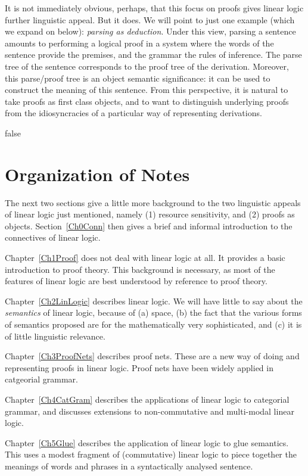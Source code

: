 It is not immediately obvious, perhaps, that this focus on proofs
gives linear logic further linguistic appeal.  But it does.  We will
point to just one example (which we expand on below): {\em parsing as
deduction}.  Under this view, parsing a sentence amounts to performing
a logical proof in a system where the words of the sentence
provide the premises, and the grammar the rules of inference.  The
parse tree of the sentence corresponds to the proof tree of the
derivation.  Moreover, this parse/proof tree is an object semantic
significance: it can be used to construct the meaning of this
sentence.  From this perspective, it is natural to take proofs as
first class objects, and to want to distinguish underlying proofs from
the idiosyncracies of a particular way of representing derivations.

\if false
\section{Organization of Notes}

The next two sections give a little more background to the two
linguistic appeals of linear logic just mentioned, namely 
(1) resource sensitivity,
and (2) proofs as objects.  
Section~\ref{Ch0Conn} then gives a brief
and informal introduction to the connectives of linear logic.

Chapter~\ref{Ch1Proof} does not deal with linear logic at all.  It
provides a basic introduction to proof theory.  This background is
necessary, as most of the features of linear logic are best understood
by reference to proof theory.  

Chapter~\ref{Ch2LinLogic} 
describes linear logic.  We will have little to say about the
{\em semantics} of linear logic, because of (a) space, (b) the fact
that the various forms of semantics proposed are for the
mathematically very sophisticated, and (c) it is of little linguistic
relevance.  

Chapter~\ref{Ch3ProofNets}  describes proof nets.  These are a new way
of doing and representing proofs in linear logic.  Proof nets have
been widely applied in catgeorial grammar.

Chapter~\ref{Ch4CatGram} describes the applications of linear logic
to categorial grammar, and discusses extensions to non-commutative
and multi-modal linear logic.

Chapter~\ref{Ch5Glue} describes the application of linear logic
to glue semantics.  This uses a modest fragment of (commutative)
linear logic to piece together the meanings of words and phrases
in a syntactically analysed sentence.

